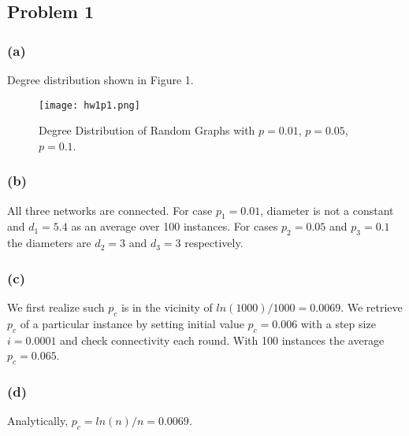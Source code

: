 \subsection*{Problem 1}
\subsubsection*{(a)}
Degree distribution shown in Figure 1.
\vspace{-12pt}
\begin{figure} [h]
	\centering
	\texttt{[image: hw1p1.png]}
	\caption{Degree Distribution of Random Graphs with $p = 0.01$, $p = 0.05$, $p = 0.1$.}
\end{figure}
\subsubsection*{(b)}
All three networks are connected. For case $p_1 = 0.01$, diameter is not a constant and $d_1 = 5.4$ as an average over 100 instances. For cases $p_2 = 0.05$ and $p_3 = 0.1$ the diameters are $d_2 = 3$ and $d_3 =3$ respectively.
\subsubsection*{(c)}
We first realize such $p_c$ is in the vicinity of $ln(1000)/1000 = 0.0069$. We retrieve $p_c$ of a particular instance by setting initial value $p_c = 0.006$ with a step size $ i = 0.0001$ and check connectivity each round. With 100 instances the average $p_c = 0.065$.
\subsubsection*{(d)}
Analytically, $p_c = ln(n)/n = 0.0069$.

